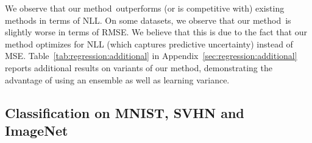 \documentclass{article}
\newcommand{\ourmethod}{our method\ }
\begin{document}
We observe that \ourmethod outperforms (or is competitive with) existing methods in terms of NLL. On some datasets, we observe that \ourmethod is slightly worse in terms of RMSE. 
We believe that this is due to the fact that our method optimizes for NLL (which captures predictive uncertainty) instead of MSE. 
Table~\ref{tab:regression:additional} in Appendix~\ref{sec:regression:additional} reports additional results on variants of our method, demonstrating the advantage of using an ensemble as well as learning variance. %













\subsection{Classification on MNIST, SVHN and ImageNet}\label{sec:classification results}
\end{document}
